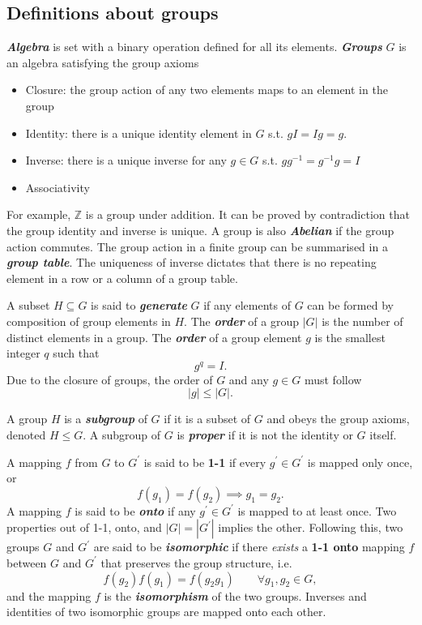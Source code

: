 \documentclass{article}
\begin{document}
\subsection{Definitions about groups}
\textit{\textbf{Algebra}} is set with a binary operation defined for all its elements. \textit{\textbf{Groups}} $G$ is an algebra satisfying the group axioms
\begin{itemize}
    \item Closure: the group action of any two elements maps to an element in the group
    \item Identity: there is a unique identity element in $G$ s.t. $g I = I g = g.$
    \item Inverse: there is a unique inverse for any $g \in G$ s.t. $g g^{-1} = g^{-1} g = I$
    \item Associativity
\end{itemize}
For example, $\mathbb{Z}$ is a group under addition. It can be proved by contradiction that the group identity and inverse is unique. A group is also \textit{\textbf{Abelian}} if the group action commutes. The group action in a finite group can be summarised in a \textit{\textbf{group table}}. The uniqueness of inverse dictates that there is no repeating element in a row or a column of a group table. 

A subset $H \subseteq G$ is said to \textit{\textbf{generate}} $G$ if any elements of $G$ can be formed by composition of group elements in $H.$ The \textit{\textbf{order}}  of a group $\left\vert G \right\vert $ is the number of distinct elements in a group. The \textit{\textbf{order}} of a group element $g$ is the smallest integer $q$ such that 
\[
    g^q = I. 
\]
Due to the closure of groups, the order of $G$ and any $g \in G$ must follow
\[
    \left\vert g \right\vert \leq \left\vert G \right\vert. 
\]

A group $H$ is a \textit{\textbf{subgroup}} of $G$ if it is a subset of $G$ and obeys the group axioms, denoted $H \leq  G.$
A subgroup of $G$ is \textit{\textbf{proper}} if it is not the identity or $G$ itself. 

A mapping $f$ from $G$ to $G^\prime $ is said to be \textbf{1-1} if every $g^\prime \in G^\prime $ is mapped only once, or 
\[
    f(g_1) = f(g_2) \implies g_1 = g_2. 
\] 
A mapping $f$ is said to be \textit{\textbf{onto}} if any $g^\prime \in G^\prime $ is mapped to at least once. Two properties out of 1-1, onto, and $\left\vert G \right\vert = \left\vert G^\prime  \right\vert $ implies the other. Following this, two groups $G$ and $G^\prime $ are said to be \textit{\textbf{isomorphic}} if there \textit{exists} a \textbf{1-1 onto} mapping $f$ between $G$ and $G^\prime $ that preserves the group structure, i.e.
\[
    f(g_2) f(g_1) = f(g_2 g_1 ) \qquad \forall g_1, g_2 \in G,
\]
and the mapping $f$ is the \textit{\textbf{isomorphism}} of the two groups. Inverses and identities of two isomorphic groups are mapped onto each other. 
\end{document}
